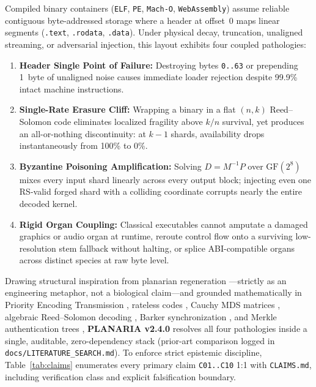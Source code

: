 \documentclass[11pt,letterpaper]{article}
\theoremstyle{remark}
\begin{document}
Compiled binary containers (\texttt{ELF}, \texttt{PE}, \texttt{Mach-O}, \texttt{WebAssembly}) assume reliable contiguous byte-addressed storage where a header at offset~0 maps linear segments (\texttt{.text}, \texttt{.rodata}, \texttt{.data}). Under physical decay, truncation, unaligned streaming, or adversarial injection, this layout exhibits four coupled pathologies:
\begin{enumerate}[leftmargin=1.8em, itemsep=1.5pt]
  \item \textbf{Header Single Point of Failure:} Destroying bytes \texttt{0..63} or prepending 1~byte of unaligned noise causes immediate loader rejection despite 99.9\% intact machine instructions.
  \item \textbf{Single-Rate Erasure Cliff:} Wrapping a binary in a flat $(n,k)$ Reed--Solomon code \cite{reed1960} eliminates localized fragility above $k/n$ survival, yet produces an all-or-nothing discontinuity: at $k-1$ shards, availability drops instantaneously from 100\% to 0\%.
  \item \textbf{Byzantine Poisoning Amplification:} Solving $D = M^{-1} P$ over $\mathrm{GF}(2^8)$ mixes every input shard linearly across every output block; injecting even one RS-valid forged shard with a colliding coordinate corrupts nearly the entire decoded kernel.
  \item \textbf{Rigid Organ Coupling:} Classical executables cannot amputate a damaged graphics or audio organ at runtime, reroute control flow onto a surviving low-resolution stem fallback without halting, or splice ABI-compatible organs across distinct species at raw byte level.
\end{enumerate}

Drawing structural inspiration from planarian regeneration \cite{reddien2004}---strictly as an engineering metaphor, not a biological claim---and grounded mathematically in Priority Encoding Transmission \cite{albanese1996}, rateless codes \cite{luby2002}, Cauchy MDS matrices \cite{bloemer1995,plank2006}, algebraic Reed--Solomon decoding \cite{berlekamp1968,massey1969,chien1964,forney1965,singleton1964}, Barker synchronization \cite{barker1953}, and Merkle authentication trees \cite{merkle1987}, \textbf{PLANARIA v2.4.0} resolves all four pathologies inside a single, auditable, zero-dependency stack (prior-art comparison logged in \texttt{docs/LITERATURE\_SEARCH.md}). To enforce strict epistemic discipline, Table~\ref{tab:claims} enumerates every primary claim \texttt{C01..C10} 1:1 with \texttt{CLAIMS.md}, including verification class and explicit falsification boundary.
\end{document}

